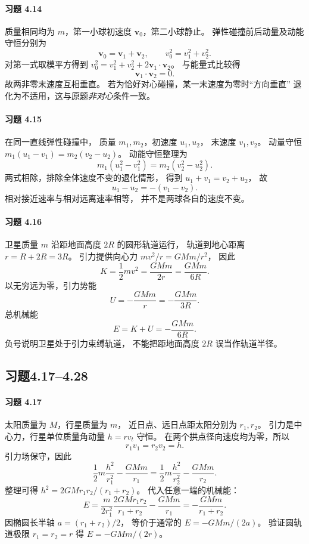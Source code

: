 \paragraph{习题 4.14}
质量相同均为 \(m\)，第一小球初速度
\(\boldsymbol v_0\)，第二小球静止。
弹性碰撞前后动量及动能守恒分别为
\[
 \boldsymbol v_0=\boldsymbol v_1+\boldsymbol v_2,
 \qquad v_0^2=v_1^2+v_2^2.
\]
对第一式取模平方得到
\(v_0^2=v_1^2+v_2^2+
2\boldsymbol v_1\cdot\boldsymbol v_2\)。
与能量式比较得
\[
 \boxed{\boldsymbol v_1\cdot\boldsymbol v_2=0}.
\]
故两非零末速度互相垂直。
若为恰好对心碰撞，某一末速度为零时“方向垂直”
退化为不适用，这与原题\emph{非对心}条件一致。

\paragraph{习题 4.15}
在同一直线弹性碰撞中，
质量 \(m_1,m_2\)，初速度 \(u_1,u_2\)，
末速度 \(v_1,v_2\)。
动量守恒
\(m_1(u_1-v_1)=m_2(v_2-u_2)\)。
动能守恒整理为
\[
 m_1(u_1^2-v_1^2)=m_2(v_2^2-u_2^2).
\]
两式相除，排除全体速度不变的退化情形，
得到
\(u_1+v_1=v_2+u_2\)，
故
\[
 \boxed{u_1-u_2=-(v_1-v_2)}.
\]
相对接近速率与相对远离速率相等，
并不是两球各自的速度不变。

\paragraph{习题 4.16}
卫星质量 \(m\) 沿距地面高度 \(2R\)
的圆形轨道运行，
轨道到地心距离 \(r=R+2R=3R\)。
引力提供向心力
\(mv^2/r=GMm/r^2\)，
因此
\[
 \boxed{K=\frac12mv^2
 =\frac{GMm}{2r}=\frac{GMm}{6R}}.
\]
以无穷远为零，引力势能
\[
 \boxed{U=-\frac{GMm}{r}=-\frac{GMm}{3R}}.
\]
总机械能
\[
 \boxed{E=K+U=-\frac{GMm}{6R}}.
\]
负号说明卫星处于引力束缚轨道，
不能把距地面高度 \(2R\) 误当作轨道半径。


\subsection*{习题4.17--4.28}
\paragraph{习题 4.17}
太阳质量为 \(M\)，行星质量为 \(m\)，
近日点、远日点距太阳分别为 \(r_1,r_2\)。
引力是中心力，行星单位质量角动量
\(h=r v_t\) 守恒。
在两个拱点径向速度均为零，所以
\[
 r_1v_1=r_2v_2=h.
\]
引力场保守，因此
\[
 \frac12m\frac{h^2}{r_1^2}-\frac{GMm}{r_1}
 =\frac12m\frac{h^2}{r_2^2}-\frac{GMm}{r_2}.
\]
整理可得
\(h^2=2GM r_1r_2/(r_1+r_2)\)。
代入任意一端的机械能：
\[
 E=\frac{m}{2r_1^2}
 \frac{2GM r_1r_2}{r_1+r_2}-\frac{GMm}{r_1}
 =\boxed{-\frac{GMm}{r_1+r_2}}.
\]
因椭圆长半轴 \(a=(r_1+r_2)/2\)，
等价于通常的 \(E=-GMm/(2a)\)。
验证圆轨道极限 \(r_1=r_2=r\)
得 \(E=-GMm/(2r)\)。

